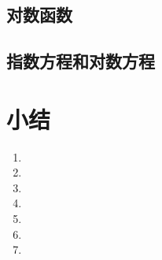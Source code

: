 \subsection{对数函数}
\begin{Practice}
  \begin{question}
    \item 
    \item 
    \item 
  \end{question}
\end{Practice}

\subsection{指数方程和对数方程}
\begin{Practice}
  \begin{question}
    \item 
    \item 
    \item 
    \item 
    \item 
    \item 
  \end{question}
\end{Practice}

\begin{Exercise}
  \begin{question}
    \item 
    \item 
    \item 
    \item 
    \item 
    \item 
    \item 
    \item 
    \item 
    \item 
    \item 
    \item 
    \item 
  \end{question}
\end{Exercise}

\section*{小结}
\begin{enumerate}[C、,itemindent=4.5em]
  \item 
  \item 
  \item 
  \item 
  \item 
  \item 
  \item 
\end{enumerate}
